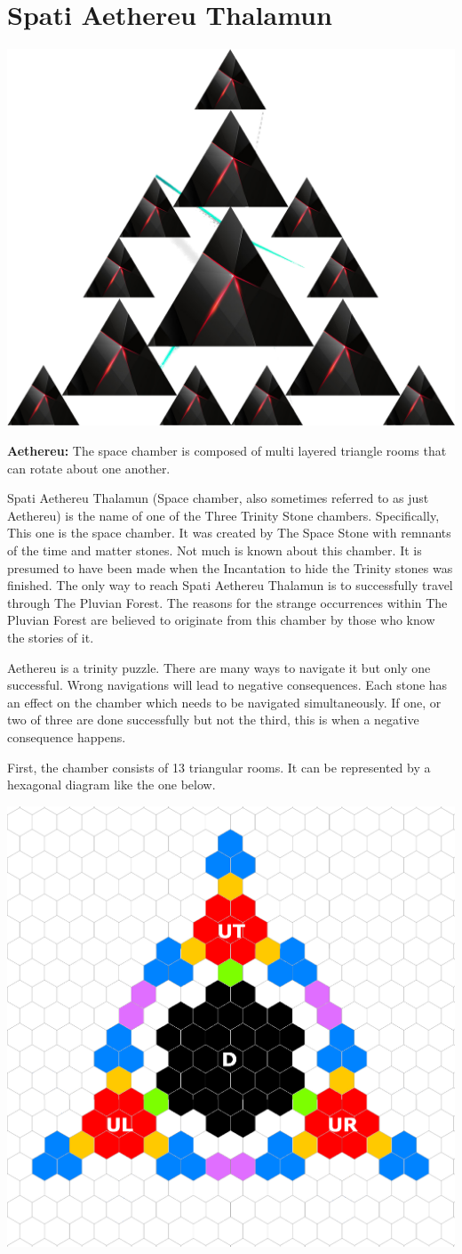 \section{Spati Aethereu Thalamun}

\begin{center}
	\includegraphics[width=0.5\linewidth]{img/maps/Aethereu.png}	
	
	{\textbf{Aethereu:} The space chamber is composed of multi layered triangle rooms that can rotate about one another.}
\end{center}

Spati Aethereu Thalamun (Space chamber, also sometimes referred to as just Aethereu) is the name of one of the Three Trinity Stone chambers. Specifically, This one is the space chamber. It was created by The Space Stone with remnants of the time and matter stones. Not much is known about this chamber. It is presumed to have been made when the Incantation to hide the Trinity stones was finished. The only way to reach Spati Aethereu Thalamun is to successfully travel through The Pluvian Forest. The reasons for the strange occurrences within The Pluvian Forest are believed to originate from this chamber by those who know the stories of it.

Aethereu is a trinity puzzle. There are many ways to navigate it but only one successful. Wrong navigations will lead to negative consequences. Each stone has an effect on the chamber which needs to be navigated simultaneously. If one, or two of three are done successfully but not the third, this is when a negative consequence happens.

First, the chamber consists of 13 triangular rooms. It can be represented by a hexagonal diagram like the one below.

\begin{center}
	\includegraphics[width=0.5\linewidth]{img/Aethereu/U.png}
\end{center}

